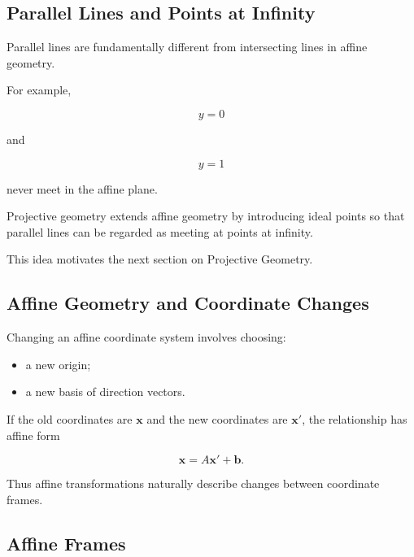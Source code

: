 \subsection{Parallel Lines and Points at Infinity}
\label{subsec:affine-parallel-projective-preview}

Parallel lines are fundamentally different from intersecting lines in affine
geometry.

For example,

\[ y=0 \]

and

\[ y=1 \]

never meet in the affine plane.

Projective geometry extends affine geometry by introducing ideal points so
that parallel lines can be regarded as meeting at points at infinity.

This idea motivates the next section on Projective Geometry.

\subsection{Affine Geometry and Coordinate Changes}
\label{subsec:affine-coordinate-changes}

Changing an affine coordinate system involves choosing:

\begin{itemize}
    \item a new origin;
    \item a new basis of direction vectors.
\end{itemize}

If the old coordinates are \(\mathbf{x}\) and the new coordinates are
\(\mathbf{x}'\), the relationship has affine form

\[ \boxed{\mathbf{x}=A\mathbf{x}'+\mathbf{b}.} \]

Thus affine transformations naturally describe changes between coordinate
frames.

\subsection{Affine Frames}
\label{subsec:affine-frames}

